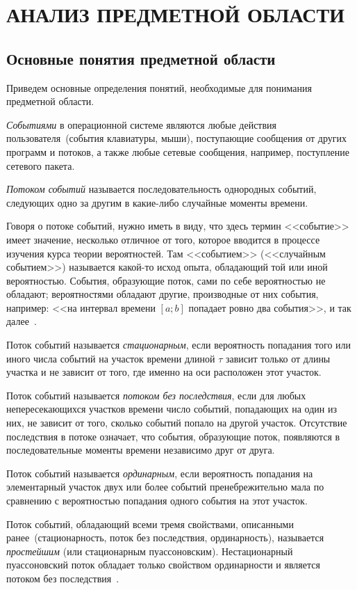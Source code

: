\section[Анализ предметной области]{АНАЛИЗ ПРЕДМЕТНОЙ ОБЛАСТИ}

\subsection{Основные понятия предметной области}

Приведем основные определения понятий, необходимые для понимания предметной
области.

\textit{Событиями} в операционной системе являются любые действия пользователя~(события
клавиатуры, мыши), поступающие сообщения от других программ и потоков, а также
любые сетевые сообщения, например, поступление сетевого пакета.

\textit{Потоком событий} называется последовательность однородных событий,
следующих одно за другим в какие-либо случайные моменты времени.

Говоря о потоке событий, нужно иметь в виду, что здесь термин <<событие>>
имеет значение, несколько отличное от того, которое вводится в процессе
изучения курса теории вероятностей. Там <<событием>> (<<случайным событием>>)
называется какой-то исход опыта, обладающий той или иной вероятностью.
События, образующие поток, сами по себе вероятностью не обладают; вероятностями
обладают другие, производные от них события, например: <<на интервал времени
$[a;b]$ попадает ровно два события>>, и так далее~\cite{ventcel_issled_op}.

Поток событий называется
\textit{стационарным}, если вероятность попадания того или иного числа
событий на участок времени длиной $\tau$ зависит только от длины участка
и не зависит от того, где именно на оси расположен этот участок.

Поток событий называется \textit{потоком без последствия}, если для любых
непересекающихся участков времени число событий, попадающих на один из них,
не зависит от того, сколько событий попало на другой участок.
Отсутствие последствия в потоке означает, что события, образующие поток,
появляются в последовательные моменты времени независимо друг от друга.

Поток событий называется \textit{ординарным}, если вероятность попадания
на элементарный участок двух или более событий пренебрежительно мала
по сравнению с вероятностью попадания одного события на этот участок.

Поток событий, обладающий всеми тремя свойствами, описанными
ранее~(стационарность, поток без последствия, ординарность), называется
\textit{простейшим} (или стационарным пуассоновским).
Нестационарный пуассоновский поток обладает только свойством ординарности и
является потоком без последствия~\cite{ventcel_tv}.

